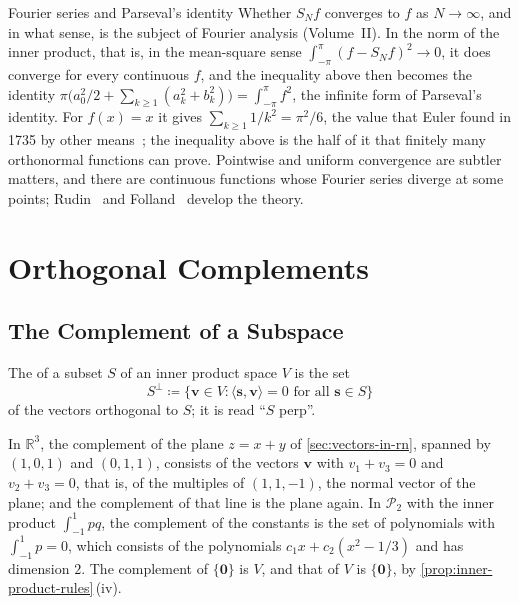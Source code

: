 \begin{note}{Fourier series and Parseval's identity}
Whether $S_Nf$ converges to $f$ as $N\to\infty$, and in what sense, is the subject of Fourier analysis (Volume~II). In the norm of the inner product, that is, in the mean-square sense $\int_{-\pi}^\pi(f-S_Nf)^2\to0$, it does converge for every continuous $f$, and the inequality above then becomes the identity $\pi\bigl(a_0^2/2+\sum_{k\ge1}(a_k^2+b_k^2)\bigr)=\int_{-\pi}^\pi f^2$, the infinite form of Parseval's identity. For $f(x)=x$ it gives $\sum_{k\ge1}1/k^2=\pi^2/6$, the value that Euler found in 1735 by other means~\cite{hairer1996analysis}; the inequality above is the half of it that finitely many orthonormal functions can prove. Pointwise and uniform convergence are subtler matters, and there are continuous functions whose Fourier series diverge at some points; Rudin~\cite[Chap.~8]{rudin1976} and Folland~\cite[Chap.~8]{folland1999} develop the theory.
\end{note}

\section{Orthogonal Complements}
\label{sec:orthogonal-complements}

\subsection{The Complement of a Subspace}

\begin{definition}
\label{def:orthogonal-complement}
The  of a subset $S$ of an inner product space $V$ is the set
\[
S^\perp\coloneqq\{\mathbf v\in V: \langle\mathbf s,\mathbf v\rangle=0\text{ for all }\mathbf s\in S\}
\]
of the vectors orthogonal to $S$; it is read ``$S$ perp''.
\end{definition}

In $\mathbb R^3$, the complement of the plane $z=x+y$ of \cref{sec:vectors-in-rn}, spanned by $(1,0,1)$ and $(0,1,1)$, consists of the vectors $\mathbf v$ with $v_1+v_3=0$ and $v_2+v_3=0$, that is, of the multiples of $(1,1,-1)$, the normal vector of the plane; and the complement of that line is the plane again. In $\mathcal P_2$ with the inner product $\int_{-1}^1pq$, the complement of the constants is the set of polynomials with $\int_{-1}^1p=0$, which consists of the polynomials $c_1x+c_2(x^2-1/3)$ and has dimension $2$. The complement of $\{\mathbf 0\}$ is $V$, and that of $V$ is $\{\mathbf 0\}$, by \cref{prop:inner-product-rules}\,(iv).

